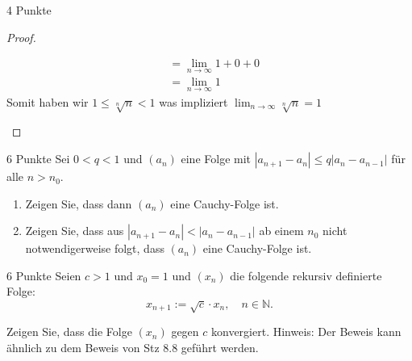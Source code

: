 \documentclass{problemset}
\begin{document}
\begin{problem}{4 Punkte}
\begin{proof}
\begin{enumerate}
\begin{align*}
                                                             & = \lim_{n \to \infty} 1 + 0 + 0                                                                                                     \\
                                                             & = \lim_{n \to \infty} 1
              \end{align*}
              Somit haben wir $1 \le \sqrt[n]{n} < 1$ was impliziert $\lim_{n \to \infty} \sqrt[n]{n} = 1$
              \checkmark
    \end{enumerate}
\end{proof}
\end{problem}

\begin{problem}{6 Punkte}
Sei $0 < q < 1$ und $(a_n)$ eine Folge mit $|a_{n+1} - a_n| \leq q |a_n - a_{n-1}|$ für alle $n > n_0$.

\begin{enumerate}
    \item Zeigen Sie, dass dann $(a_n)$ eine Cauchy-Folge ist.
    \item Zeigen Sie, dass aus $|a_{n+1} - a_n| < |a_n - a_{n-1}|$ ab einem
          $n_0$ nicht notwendigerweise folgt, dass $(a_n)$ eine Cauchy-Folge
          ist.
\end{enumerate}
\end{problem}

\begin{problem}{6 Punkte}
Seien $c > 1$ und $x_0 = 1$ und $(x_n)$ die folgende rekursiv definierte Folge:
\[
    x_{n+1} := \sqrt{c} \cdot x_n, \quad n \in \mathbb{N}.
\]

Zeigen Sie, dass die Folge $(x_n)$ gegen $c$ konvergiert. Hinweis: Der Beweis
kann ähnlich zu dem Beweis von Stz 8.8 geführt werden.
\end{problem}
\end{document}

